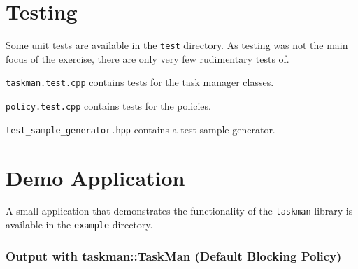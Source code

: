 \documentclass[a4paper]{scrartcl}
\begin{document}
\section{Testing}
Some unit tests are available in the \texttt{test} directory.
As testing was not the main focus of the exercise, there are only very few rudimentary tests of.


\texttt{taskman.test.cpp} contains tests for the task manager classes.

\texttt{policy.test.cpp} contains tests for the policies.

\texttt{test_sample_generator.hpp} contains a test sample generator.


\section{Demo Application}
A small application that demonstrates the functionality of the \texttt{taskman} library is available in the \texttt{example} directory.

\subsubsection{Output with taskman::TaskMan (Default Blocking Policy)}
\end{document}
